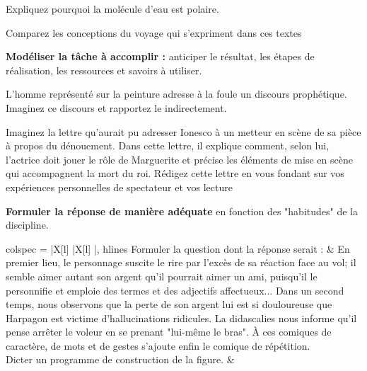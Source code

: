 \begin{encart}
  Expliquez pourquoi la molécule d'eau est polaire.
\end{encart}

\begin{encart}
  Comparez les conceptions du voyage qui s'expriment dans ces textes   
\end{encart}


\hspace{16pt}\pointCyan \textbf{Modéliser la tâche à accomplir :}
anticiper le résultat, les étapes de réalisation, les ressources et savoirs à utiliser.

\begin{encart}
  L'homme représenté sur la peinture adresse à la foule un discours prophétique. Imaginez ce discours et rapportez le indirectement.
\end{encart}

\begin{encart}
  Imaginez la lettre qu'aurait pu adresser Ionesco à un metteur en scène de sa pièce à propos du dénouement.
  Dans cette lettre, il explique comment, selon lui, l'actrice doit jouer le rôle de Marguerite et précise les éléments de mise en scène qui accompagnent la mort du roi.
  Rédigez cette lettre en vous fondant sur vos expériences personnelles de spectateur et vos lecture
\end{encart}


\hspace{16pt}\pointCyan \textbf{Formuler la réponse de manière adéquate} en fonction des "habitudes" de la discipline.



\begin{tblr}{
  colspec = {|X[l] |X[l] |}, hlines
}
  Formuler la question dont la réponse serait : &
  En premier lieu, le personnage suscite le rire par l'excès de sa réaction face au vol;
  il semble aimer autant son argent qu'il pourrait aimer un ami, 
  puisqu'il le personnifie et emploie des termes et des adjectifs affectueux...
  Dans un second temps, nous observons que la perte de son argent lui est si douloureuse que Harpagon est victime d'hallucinations ridicules.
  La didascalies nous informe qu'il pense arrêter le voleur en se prenant "lui-même le bras".
  À ces comiques de caractère, de mots et de gestes s'ajoute enfin le comique de répétition. \\
  Dicter un programme de construction de la figure. & 
  \centering
\end{tblr}